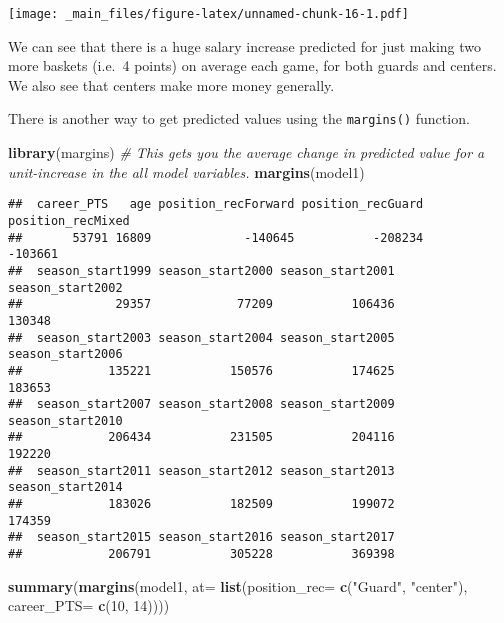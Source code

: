 \documentclass[
]{book}
\newenvironment{Shaded}{\begin{snugshade}}{\end{snugshade}}
\newcommand{\AttributeTok}[1]{\textcolor[rgb]{0.13,0.29,0.53}{#1}}
\newcommand{\CommentTok}[1]{\textcolor[rgb]{0.56,0.35,0.01}{\textit{#1}}}
\newcommand{\DecValTok}[1]{\textcolor[rgb]{0.00,0.00,0.81}{#1}}
\newcommand{\FunctionTok}[1]{\textcolor[rgb]{0.13,0.29,0.53}{\textbf{#1}}}
\newcommand{\NormalTok}[1]{#1}
\newcommand{\StringTok}[1]{\textcolor[rgb]{0.31,0.60,0.02}{#1}}
\begin{document}
\texttt{[image: \_main\_files/figure-latex/unnamed-chunk-16-1.pdf]}

We can see that there is a huge salary increase predicted for just making two more baskets (i.e.~4 points) on average each game, for both guards and centers. We also see that centers make more money generally.

There is another way to get predicted values using the \texttt{margins()} function.

\begin{Shaded}
\begin{Highlighting}[]
\FunctionTok{library}\NormalTok{(margins)}
\CommentTok{\# This gets you the average change in predicted value for a unit{-}increase in the all model variables.}
\FunctionTok{margins}\NormalTok{(model1)}
\end{Highlighting}
\end{Shaded}

\begin{verbatim}
##  career_PTS   age position_recForward position_recGuard position_recMixed
##       53791 16809             -140645           -208234           -103661
##  season_start1999 season_start2000 season_start2001 season_start2002
##             29357            77209           106436           130348
##  season_start2003 season_start2004 season_start2005 season_start2006
##            135221           150576           174625           183653
##  season_start2007 season_start2008 season_start2009 season_start2010
##            206434           231505           204116           192220
##  season_start2011 season_start2012 season_start2013 season_start2014
##            183026           182509           199072           174359
##  season_start2015 season_start2016 season_start2017
##            206791           305228           369398
\end{verbatim}

\begin{Shaded}
\begin{Highlighting}[]
\FunctionTok{summary}\NormalTok{(}\FunctionTok{margins}\NormalTok{(model1, }\AttributeTok{at=} \FunctionTok{list}\NormalTok{(}\AttributeTok{position\_rec=} \FunctionTok{c}\NormalTok{(}\StringTok{"Guard"}\NormalTok{, }\StringTok{"center"}\NormalTok{),}
                         \AttributeTok{career\_PTS=} \FunctionTok{c}\NormalTok{(}\DecValTok{10}\NormalTok{, }\DecValTok{14}\NormalTok{))))}
\end{Highlighting}
\end{Shaded}
\end{document}
